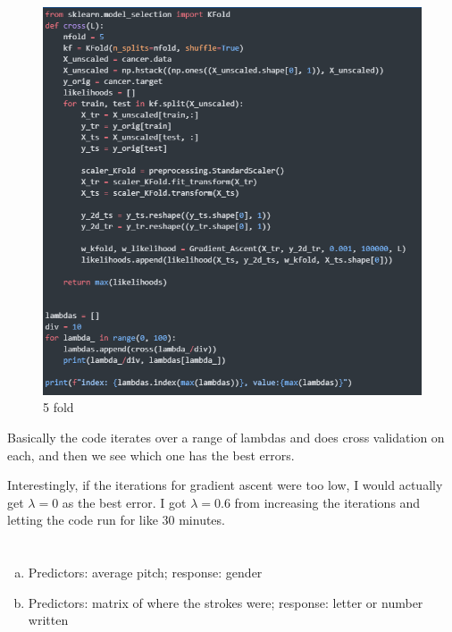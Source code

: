 \documentclass[12pt]{article}
\begin{document}
\begin{itemize}
	\begin{figure}[H]
		\centering
		\includegraphics[width=\textwidth]{images/kfold.png}
		\caption{5 fold}
		\label{fig:4:kfold}
	\end{figure}	
\end{itemize}
Basically the code iterates over a range of lambdas and does cross validation on each, and then we see which one has the best errors.

Interestingly, if the iterations for gradient ascent were too low, I would actually get $ \lambda = 0 $ as the best error. I got $ \lambda = 0.6 $ from increasing the iterations and letting the code run for like 30 minutes. 
\newpage

\section{}
\begin{enumerate}[(a)]
	\item Predictors: average pitch; response: gender
	
	\item Predictors: matrix of where the strokes were; response: letter or number written
\end{enumerate}
\newpage
\end{document}

